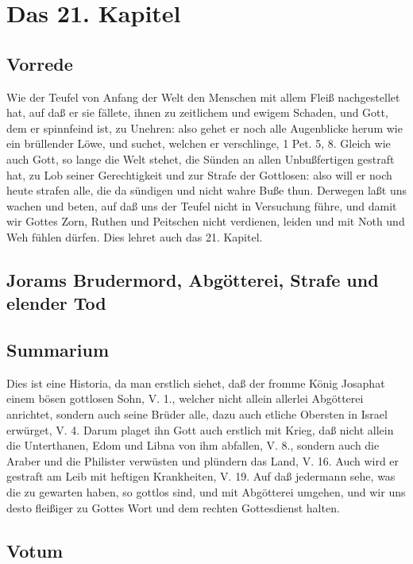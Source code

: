 \chapter{Das 21. Kapitel}

\section{Vorrede}

Wie der Teufel von Anfang der Welt den Menschen mit allem Fleiß nachgestellet hat, auf daß er sie fällete, ihnen zu zeitlichem und ewigem Schaden, und Gott, dem er spinnfeind ist, zu Unehren: also gehet er noch alle Augenblicke herum wie ein brüllender Löwe, und suchet, welchen er verschlinge, 1 Pet. 5, 8. Gleich wie auch Gott, so lange die Welt stehet, die Sünden an allen Unbußfertigen gestraft hat, zu Lob seiner Gerechtigkeit und zur Strafe der Gottlosen: also will er noch heute strafen alle, die da sündigen und nicht wahre Buße thun. Derwegen laßt uns wachen und beten, auf daß uns der Teufel nicht in Versuchung führe, und damit wir Gottes Zorn, Ruthen und Peitschen nicht verdienen, leiden und mit Noth und Weh fühlen dürfen. Dies lehret auch das 21. Kapitel.

\section[Jorams Brudermord, Abgötterei, Strafe und elender Tod]{Jorams Brudermord, Abgötterei, Strafe und elender Tod}

\section{Summarium}

Dies ist eine Historia, da man erstlich siehet, daß der fromme König Josaphat einem bösen gottlosen Sohn, V. 1., welcher nicht allein allerlei Abgötterei anrichtet, sondern auch seine Brüder alle, dazu auch etliche Obersten in Israel erwürget, V. 4. Darum plaget ihn Gott auch erstlich mit Krieg, daß nicht allein die Unterthanen, Edom und Libna von ihm abfallen, V. 8., sondern auch die Araber und die Philister verwüsten und plündern das Land, V. 16. Auch wird er gestraft am Leib mit heftigen Krankheiten, V. 19. Auf daß jedermann sehe, was die zu gewarten haben, so gottlos sind, und mit Abgötterei umgehen, und wir uns desto fleißiger zu Gottes Wort und dem rechten Gottesdienst halten.

\section{Votum}

